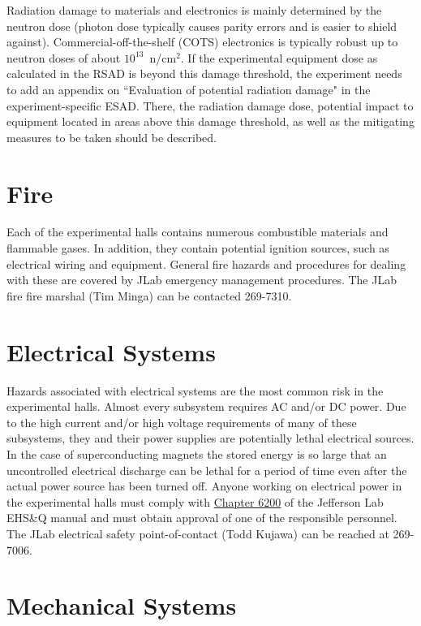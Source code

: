 \documentclass[11pt]{report}
\begin{document}
Radiation damage to materials and electronics is mainly determined by the neutron 
dose (photon dose typically causes parity errors and is easier to shield against). 
Commercial-off-the-shelf (COTS) electronics is typically robust up to neutron doses of 
about $10^{13}$~n/cm$^2$. If the experimental equipment dose as calculated in the RSAD 
is beyond this damage threshold, the experiment needs to add an appendix on ``Evaluation 
of potential radiation damage" in the experiment-specific ESAD. There, the radiation 
damage dose, potential impact to equipment located in areas above this damage threshold, 
as well as the mitigating measures to be taken should be described.

\section{Fire}

Each of the experimental halls contains numerous combustible materials and flammable gases. 
In addition, they contain potential ignition sources, such as electrical wiring and equipment. 
General fire hazards and procedures for dealing with these are covered by JLab emergency 
management procedures. The JLab fire fire marshal (Tim Minga) can be contacted 269-7310.

\section{Electrical Systems}

Hazards associated with electrical systems are the most common risk in the experimental 
halls. Almost every subsystem requires AC and/or DC power. Due to the high current and/or 
high voltage requirements of many of these subsystems, they and their power supplies are 
potentially lethal electrical sources. In the case of superconducting magnets the stored 
energy is so large that an uncontrolled electrical discharge can be lethal for a period of 
time even after the actual power source has been turned off. Anyone working on electrical 
power in the experimental halls must comply with 
\href{http://www.jlab.org/ehs/ehsmanual/manual/6200.html}{Chapter 6200} of the Jefferson Lab 
EHS\&Q manual and must obtain approval of one of the responsible personnel. The JLab 
electrical safety point-of-contact (Todd Kujawa) can be reached at 269-7006.

\section{Mechanical Systems}
\end{document}
